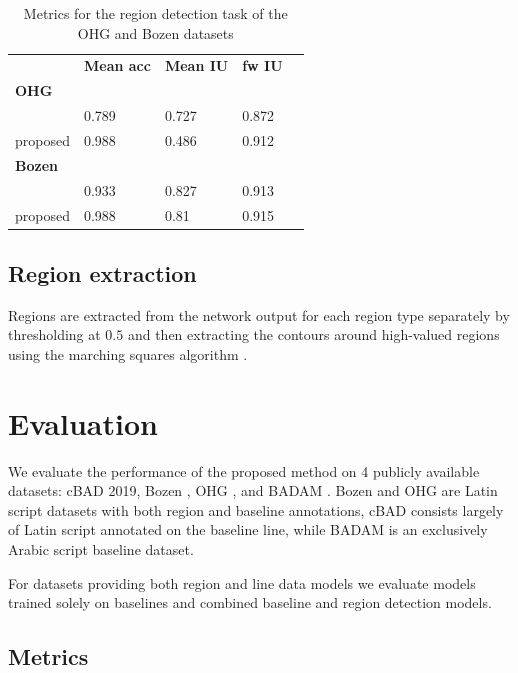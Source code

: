 \begin{table}[h!]
\begin{center}
\caption{Metrics for the region detection task of the OHG and Bozen datasets}
\label{tab:regs}
\begin{tabularx}{\columnwidth}{lp{1.7cm}p{1.7cm}p{1.7cm}p{1.7cm}} \toprule
	& \textbf{Mean acc} & \textbf{Mean IU} & \textbf{fw IU}\\
\addlinespace
\textbf{OHG}\ \\ \midrule
\cite{quiros2018multi} & 0.789 & 0.727 & 0.872\\
proposed & 0.988 & 0.486 & 0.912\\
\addlinespace
\textbf{Bozen}\ \\ \midrule
\cite{quiros2018multi} & 0.933 & 0.827 & 0.913\\
proposed & 0.988 & 0.81 & 0.915\\
\bottomrule
\end{tabularx}
\end{center}
\end{table}

\subsection{Region extraction}

Regions are extracted from the network output for each region type separately
by thresholding at $0.5$ and then extracting the contours around high-valued
regions using the marching squares algorithm \cite{lorensen1987marching}.

\section{Evaluation}

We evaluate the performance of the proposed method on 4 publicly available
datasets: cBAD 2019\cite{diem_markus_2019_3568023}, Bozen
\cite{toselli_a_h_2018_1164045}, OHG \cite{quiros2018hmms}, and BADAM
\cite{kiessling2019badam}. Bozen and OHG are Latin script datasets
with both region and baseline annotations, cBAD consists largely of Latin
script annotated on the baseline line, while BADAM is an exclusively Arabic
script baseline dataset.

For datasets providing both region and line data models we evaluate models
trained solely on baselines and combined baseline and region detection models.

\subsection{Metrics}

